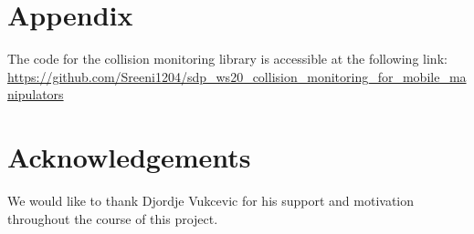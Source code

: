 \documentclass[a4paper, 11.5pt, conference]{ieeeconf}      %
\begin{document}



\section*{Appendix}
The code for the collision monitoring library is accessible at the following link: \url{https://github.com/Sreeni1204/sdp\_ws20\_collision\_monitoring\_for\_mobile\_manipulators}

\section*{Acknowledgements}
We would like to thank Djordje Vukcevic for his support and motivation throughout the course of this project.

\end{document}
